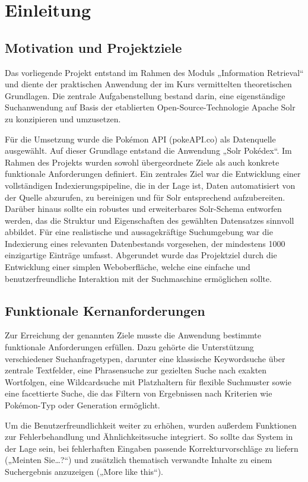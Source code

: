 \section{Einleitung}
\label{chap:einleitung}

\subsection{Motivation und Projektziele}
Das vorliegende Projekt entstand im Rahmen des Moduls „Information Retrieval“ und diente der praktischen Anwendung der im Kurs vermittelten theoretischen Grundlagen. Die zentrale Aufgabenstellung bestand darin, eine eigenständige Suchanwendung auf Basis der etablierten Open-Source-Technologie Apache Solr zu konzipieren und umzusetzen.

Für die Umsetzung wurde die Pokémon API (pokeAPI.co) als Datenquelle ausgewählt. Auf dieser Grundlage entstand die Anwendung „Solr Pokédex“. Im Rahmen des Projekts wurden sowohl übergeordnete Ziele als auch konkrete funktionale Anforderungen definiert. Ein zentrales Ziel war die Entwicklung einer vollständigen Indexierungspipeline, die in der Lage ist, Daten automatisiert von der Quelle abzurufen, zu bereinigen und für Solr entsprechend aufzubereiten. Darüber hinaus sollte ein robustes und erweiterbares Solr-Schema entworfen werden, das die Struktur und Eigenschaften des gewählten Datensatzes sinnvoll abbildet. Für eine realistische und aussagekräftige Suchumgebung war die Indexierung eines relevanten Datenbestands vorgesehen, der mindestens 1000 einzigartige Einträge umfasst. Abgerundet wurde das Projektziel durch die Entwicklung einer simplen Weboberfläche, welche eine einfache und benutzerfreundliche Interaktion mit der Suchmaschine ermöglichen sollte.

\subsection{Funktionale Kernanforderungen}

Zur Erreichung der genannten Ziele musste die Anwendung bestimmte funktionale Anforderungen erfüllen. Dazu gehörte die Unterstützung verschiedener Suchanfragetypen, darunter eine klassische Keywordsuche über zentrale Textfelder, eine Phrasensuche zur gezielten Suche nach exakten Wortfolgen, eine Wildcardsuche mit Platzhaltern für flexible Suchmuster sowie eine facettierte Suche, die das Filtern von Ergebnissen nach Kriterien wie Pokémon-Typ oder Generation ermöglicht.

Um die Benutzerfreundlichkeit weiter zu erhöhen, wurden außerdem Funktionen zur Fehlerbehandlung und Ähnlichkeitssuche integriert. So sollte das System in der Lage sein, bei fehlerhaften Eingaben passende Korrekturvorschläge zu liefern („Meinten Sie…?“) und zusätzlich thematisch verwandte Inhalte zu einem Suchergebnis anzuzeigen („More like this“).

